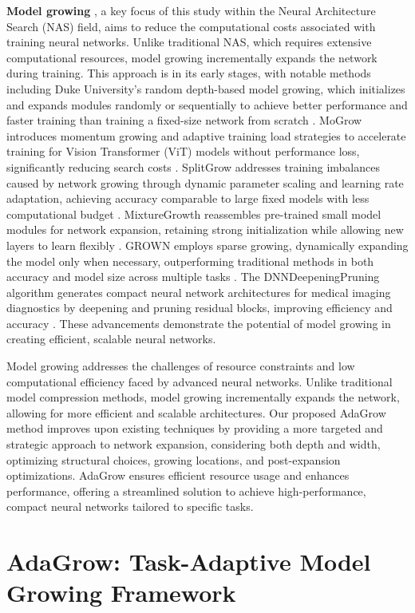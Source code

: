 \documentclass[preprint,12pt]{elsarticle}
\begin{document}
\textbf{Model growing} \cite{autogrow}, a key focus of this study within the Neural Architecture Search (NAS) field, aims to reduce the computational costs associated with training neural networks. Unlike traditional NAS, which requires extensive computational resources, model growing incrementally expands the network during training. This approach is in its early stages, with notable methods including Duke University's random depth-based model growing, which initializes and expands modules randomly or sequentially to achieve better performance and faster training than training a fixed-size network from scratch \cite{autogrow}. MoGrow introduces momentum growing and adaptive training load strategies to accelerate training for Vision Transformer (ViT) models without performance loss, significantly reducing search costs \cite{mogrow}. SplitGrow addresses training imbalances caused by network growing through dynamic parameter scaling and learning rate adaptation, achieving accuracy comparable to large fixed models with less computational budget \cite{splitgrow}. MixtureGrowth reassembles pre-trained small model modules for network expansion, retaining strong initialization while allowing new layers to learn flexibly \cite{mixturegrowth}. GROWN employs sparse growing, dynamically expanding the model only when necessary, outperforming traditional methods in both accuracy and model size across multiple tasks \cite{grown}. The DNNDeepeningPruning algorithm generates compact neural network architectures for medical imaging diagnostics by deepening and pruning residual blocks, improving efficiency and accuracy \cite{DNNDeepeningPruning}. These advancements demonstrate the potential of model growing in creating efficient, scalable neural networks.


Model growing addresses the challenges of resource constraints and low computational efficiency faced by advanced neural networks. Unlike traditional model compression methods, model growing incrementally expands the network, allowing for more efficient and scalable architectures. Our proposed AdaGrow method improves upon existing techniques by providing a more targeted and strategic approach to network expansion, considering both depth and width, optimizing structural choices, growing locations, and post-expansion optimizations. AdaGrow ensures efficient resource usage and enhances performance, offering a streamlined solution to achieve high-performance, compact neural networks tailored to specific tasks.


\section{AdaGrow: Task-Adaptive Model Growing Framework}
\label{method}
\end{document}
